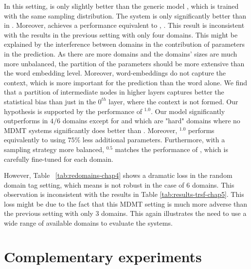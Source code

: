 In this setting,  is only slightly better than the generic model , which is trained with the same sampling distribution. The system is only significantly better than  in . Moreover,  achieves a performance equivalent to , . This result is inconsistent with the results in the previous setting with only four domains. This might be explained by the interference between domains in the contribution of parameters in the prediction. As there are more domains and the domains' sizes are much more unbalanced, the partition of the parameters should be more extensive than the word embedding level. Moreover, word-embeddings do not capture the context, which is more important for the prediction than the word alone. We find that a partition of intermediate nodes in higher layers captures better the statistical bias than just in the $0^{th}$ layer, where the context is not formed. Our hypothesis is supported by the performance of $^{1.0}$. Our model significantly outperforms  in $4/6$ domains except for  and  which are "hard" domains where no MDMT systems significantly does better than . Moreover, $^{1.0}$ performs equivalently to  using $75\%$ less additional parameters. Furthermore, with a sampling strategy more balanced, $^{0.5}$ matches the performance of , which is carefully fine-tuned for each domain.

However, Table ~\ref{tab:redomains-chap4} shows a dramatic loss in the random domain tag setting, which means  is not robust in the case of 6 domains. This observation is inconsistent with the results in Table \ref{tab:results-trsf-chap5}. This loss might be due to the fact that this MDMT setting is much more adverse than the previous setting with only 3 domains. This again illustrates the need to use a wide range of available domains to evaluate the systems.

\section{Complementary experiments\label{sec:Discussion-chap5}}
